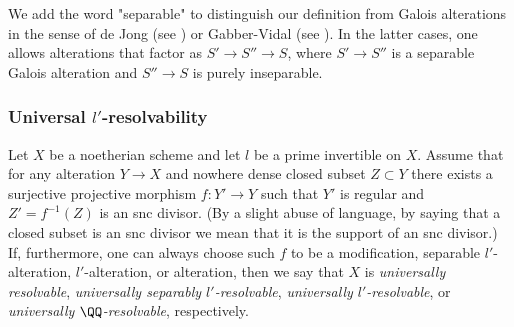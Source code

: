\documentclass[10pt]{../fichiers-configuration-latex/smfart}
\begin{document}
\begin{remark2}
We add the word "separable" to distinguish our definition from Galois alterations
in the sense of de Jong (see \cite{Alterations@de_Jong}) or Gabber-Vidal
(see \cite[p. 370]{Brauer@Vidal}). In the latter cases, one allows alterations
that factor as $S'\to S''\to S$, where $S'\to S''$ is a separable Galois alteration
and $S''\to S$ is purely inseparable.
\end{remark2}

\subsubsection{Universal $l'$-resolvability}\label{10-resolvsec}
Let $X$ be a noetherian scheme and let $l$ be a prime invertible on $X$. Assume that
for any alteration $Y\to X$ and nowhere dense closed subset $Z\subset Y$ there exists
a surjective projective morphism $f{\colon}Y'\to Y$ such that $Y'$ is regular and
$Z'=f^{-1}(Z)$ is an snc divisor. (By a slight abuse of language, by saying that
a closed subset is an snc divisor we mean that it is the support of an snc divisor.)
If, furthermore, one can always choose such $f$ to be a modification, separable
$l'$-alteration, $l'$-alteration, or alteration, then we say that $X$ is
{\em universally resolvable}, {\em universally separably $l'$-resolvable},
{\em universally $l'$-resolvable}, or {\em universally $\QQ$-resolvable}, respectively.
\end{document}
